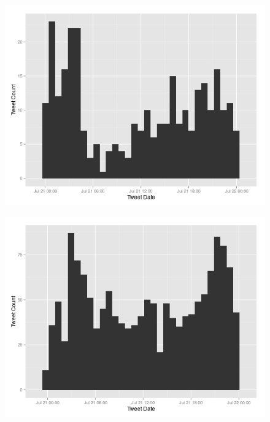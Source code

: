  \begin{figure}[H]
 	\centering
 	\begin{minipage}{.45\linewidth}
 		\includegraphics[width=\linewidth]{images/nrumorburst1.jpeg}
 		\label{nrb1}
 	\end{minipage}
 	\hspace{.05\linewidth}
 	\begin{minipage}{.45\linewidth}
 		\includegraphics[width=\linewidth]{images/nrumorburst2.jpeg}
 		\label{nrb2}
 	\end{minipage}
 \end{figure}
 
